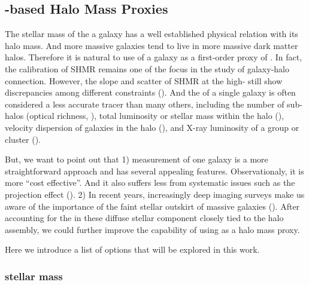 \documentclass[a4paper,fleqn,usenatbib]{mnras}
\begin{document}
\subsection{\mstar{}-based Halo Mass Proxies}
    \label{sec:proxy_mstar}

    The stellar mass of the a galaxy has a well established physical relation with its halo mass.
    And more massive galaxies tend to live in more massive dark matter halos.
    Therefore it is natural to use \mstar{} of a galaxy as a first-order proxy of \mvir{}.
    In fact, the calibration of SHMR remains one of the focus in the study of galaxy-halo connection.
    However, the slope and scatter of SHMR at the high-\mstar{} still show discrepancies among
    different constraints (\addref{}).
    And the \mstar{} of a single galaxy is often considered a less accurate \mvir{} tracer
    than many others, including the number of sub-halos (optical richness, \addref{}),
    total luminosity or stellar mass within the halo (\addref{}), velocity dispersion of galaxies
    in the halo (\addref{}), and X-ray luminosity of a group or cluster (\addref{}).

    But, we want to point out that
    1) \mstar{} measurement of one galaxy is a more straightforward approach and has several
    appealing features. Observationaly, it is more ``cost effective''. And it also suffers less
    from systematic issues such as the projection effect (\addref{}).
    2) In recent years, increasingly deep imaging surveys make us aware of the importance of the
    faint stellar outskirt of massive galaxies (\addref{}).
    After accounting for the \mstar{} in these diffuse stellar component closely tied to the
    halo assembly, we could further improve the capability of using \mstar{} as a halo mass proxy.

    Here we introduce a list of \mstar{} options that will be explored in this work.

\subsubsection{\cmodel{} stellar mass}
    \label{sec:mcmodel}
\end{document}
